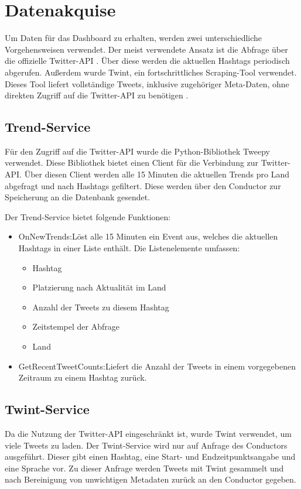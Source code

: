 \documentclass[conference]{IEEEtran}
\begin{document}
\section{Datenakquise}
Um Daten für das Dashboard zu erhalten, werden zwei unterschiedliche Vorgehensweisen verwendet.
Der meist verwendete Ansatz ist die Abfrage über die offizielle Twitter-API \cite{twitterapi}.
Über diese werden die aktuellen Hashtags periodisch abgerufen.
Außerdem wurde Twint, ein fortschrittliches Scraping-Tool verwendet.
Dieses Tool liefert vollständige Tweets, inklusive zugehöriger Meta-Daten,
ohne direkten Zugriff auf die Twitter-API zu benötigen \cite{twint}.

\newpage 

\subsection*{Trend-Service}
Für den Zugriff auf die Twitter-API wurde die Python-Bibliothek Tweepy \cite{tweepy} verwendet.
Diese Bibliothek bietet einen Client für die Verbindung zur Twitter-API.
Über diesen Client werden alle 15 Minuten die aktuellen Trends pro Land abgefragt und nach Hashtags gefiltert.
Diese werden über den Conductor zur Speicherung an die Datenbank gesendet.

Der Trend-Service bietet folgende Funktionen:
\begin{itemize}
    \item OnNewTrends:\newline Löst alle 15 Minuten ein Event aus, welches die aktuellen Hashtags in einer Liste enthält. Die Listenelemente umfassen:
          \begin{itemize}
              \item Hashtag
              \item Platzierung nach Aktualität im Land
              \item Anzahl der Tweets zu diesem Hashtag
              \item Zeitstempel der Abfrage
              \item Land
          \end{itemize}
    \item GetRecentTweetCounts:\newline Liefert die Anzahl der Tweets in einem vorgegebenen Zeitraum zu einem Hashtag zurück.

\end{itemize}

\subsection*{Twint-Service}
Da die Nutzung der Twitter-API eingeschränkt ist, wurde Twint verwendet, um viele Tweets zu laden.
Der Twint-Service wird nur auf Anfrage des Conductors ausgeführt.
Dieser gibt einen Hashtag, eine Start- und Endzeitpunktsangabe und eine Sprache vor.
Zu dieser Anfrage werden Tweets mit Twint gesammelt und nach Bereinigung von unwichtigen Metadaten zurück an den Conductor gegeben.
\end{document}
